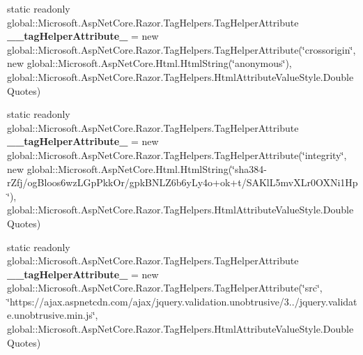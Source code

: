 \begin{DoxyCompactItemize}
\mbox{\label{class_projeto_e_s_w_1_1_areas_1_1_identity_1_1_pages_1_1_areas___identity___pages_____validation_scripts_partial_a34d7d9869c21b4ba705e4dd6a58bba34}} 
static readonly global\+::\+Microsoft.\+Asp\+Net\+Core.\+Razor.\+Tag\+Helpers.\+Tag\+Helper\+Attribute {\bfseries \+\_\+\+\_\+tag\+Helper\+Attribute\+\_} = new global\+::\+Microsoft.\+Asp\+Net\+Core.\+Razor.\+Tag\+Helpers.\+Tag\+Helper\+Attribute(\char`\"{}crossorigin\char`\"{}, new global\+::\+Microsoft.\+Asp\+Net\+Core.\+Html.\+Html\+String(\char`\"{}anonymous\char`\"{}), global\+::\+Microsoft.\+Asp\+Net\+Core.\+Razor.\+Tag\+Helpers.\+Html\+Attribute\+Value\+Style.\+Double\+Quotes)
\item 
\mbox{\label{class_projeto_e_s_w_1_1_areas_1_1_identity_1_1_pages_1_1_areas___identity___pages_____validation_scripts_partial_ac03ff6c2a137acdabab92f72aee30e2d}} 
static readonly global\+::\+Microsoft.\+Asp\+Net\+Core.\+Razor.\+Tag\+Helpers.\+Tag\+Helper\+Attribute {\bfseries \+\_\+\+\_\+tag\+Helper\+Attribute\+\_} = new global\+::\+Microsoft.\+Asp\+Net\+Core.\+Razor.\+Tag\+Helpers.\+Tag\+Helper\+Attribute(\char`\"{}integrity\char`\"{}, new global\+::\+Microsoft.\+Asp\+Net\+Core.\+Html.\+Html\+String(\char`\"{}sha384-\/r\+Zfj/og\+Bloos6wz\+L\+Gp\+Pkk\+Or/gpk\+B\+N\+L\+Z6b6y\+Ly4o+ok+t/S\+A\+Kl\+L5mv\+X\+Lr0\+O\+X\+Ni1\+Hp\char`\"{}), global\+::\+Microsoft.\+Asp\+Net\+Core.\+Razor.\+Tag\+Helpers.\+Html\+Attribute\+Value\+Style.\+Double\+Quotes)
\item 
\mbox{\label{class_projeto_e_s_w_1_1_areas_1_1_identity_1_1_pages_1_1_areas___identity___pages_____validation_scripts_partial_a6b646966101312f3c2b0978f60e0c204}} 
static readonly global\+::\+Microsoft.\+Asp\+Net\+Core.\+Razor.\+Tag\+Helpers.\+Tag\+Helper\+Attribute {\bfseries \+\_\+\+\_\+tag\+Helper\+Attribute\+\_} = new global\+::\+Microsoft.\+Asp\+Net\+Core.\+Razor.\+Tag\+Helpers.\+Tag\+Helper\+Attribute(\char`\"{}src\char`\"{}, \char`\"{}https\+://ajax.\+aspnetcdn.\+com/ajax/jquery.\+validation.\+unobtrusive/3../jquery.\+validate.\+unobtrusive.\+min.\+js\char`\"{}, global\+::\+Microsoft.\+Asp\+Net\+Core.\+Razor.\+Tag\+Helpers.\+Html\+Attribute\+Value\+Style.\+Double\+Quotes)

\end{DoxyCompactItemize}
